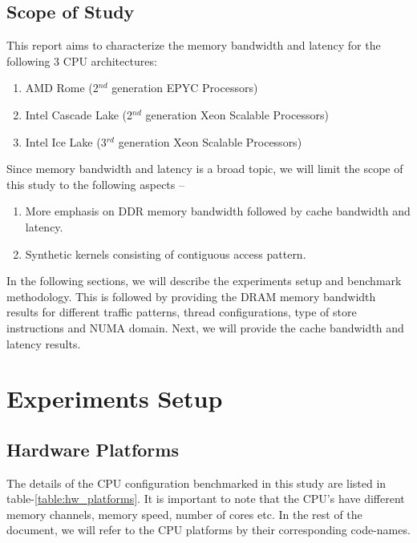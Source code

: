 \documentclass{article}
\begin{document}
\subsection{Scope of Study}
This report aims to characterize the memory bandwidth and latency for the following 3 CPU architectures:
\begin{enumerate}
    \item AMD Rome (2$^{nd}$ generation EPYC Processors)
    \item Intel Cascade Lake (2$^{nd}$  generation Xeon Scalable Processors)
    \item Intel Ice Lake (3$^{rd}$  generation Xeon Scalable Processors)
\end{enumerate}
Since memory bandwidth and latency is a broad topic, we will limit the scope of this study to the following aspects --
\begin{enumerate}
\item More emphasis on DDR memory bandwidth followed by cache bandwidth and latency.
\item Synthetic kernels consisting of contiguous access pattern.
\end{enumerate}

In the following sections, we will describe the experiments setup and benchmark methodology. This is followed by providing the DRAM memory bandwidth results for different traffic patterns, thread configurations, type of store instructions and NUMA domain. Next, we will provide the cache bandwidth and latency results. 

\section{Experiments Setup}
\subsection{Hardware Platforms}
The details of the CPU configuration benchmarked in this study are listed in table-\ref{table:hw_platforms}. It is important to note that the CPU's have different memory channels, memory speed, number of cores etc. In the rest of the document, we will refer to the CPU platforms by their corresponding code-names.
\end{document}
